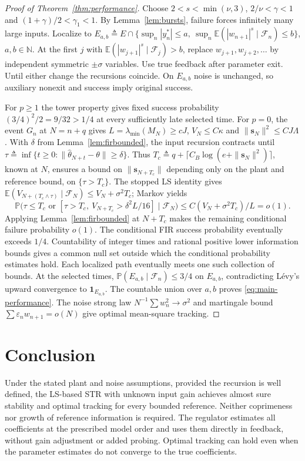 \documentclass[11pt,reqno]{amsart}
\numberwithin{equation}{section}
\theoremstyle{definition}
\theoremstyle{remark}
\newcommand{\E}{\mathbb E}
\newcommand{\Prob}{\mathbb P}
\newcommand{\F}{\mathcal F}
\newcommand{\thh}{\widehat\theta}
\newcommand{\ind}{\mathbf 1}
\begin{document}
\begin{proof}[Proof of Theorem~\ref{thm:performance}]
Choose $2<s<\min(\nu,3)$, $2/\nu<\gamma<1$ and $(1+\gamma)/2<\gamma_1<1$. By Lemma~\ref{lem:bursts}, failure forces infinitely many large inputs. Localize to
$E_{a,b}\triangleq E\cap\{\sup_n|y_n^*|\le a,\ \sup_n\E(|w_{n+1}|^s\mid\F_n)\le b\}$, $a,b\in\mathbb N$. At the first $j$ with $\E(|w_{j+1}|^s\mid\F_j)>b$, replace $w_{j+1},w_{j+2},\ldots$ by independent symmetric $\pm\sigma$ variables. Use true feedback after parameter exit. Until either change the recursions coincide. On $E_{a,b}$ noise is unchanged, so auxiliary nonexit and success imply original success.

For $p\ge1$ the tower property gives fixed success probability $(3/4)^2/2=9/32>1/4$ at every sufficiently late selected time. For $p=0$, the event $G_n$ at $N=n+q$ gives
$L=\lambda_{\min}(M_N)\ge cJ$, $V_N\le C\kappa$ and
$\|\mathbf s_N\|^2\le CJ\Lambda$. With $\delta$ from Lemma~\ref{lem:firbounded}, the input recursion contracts until $\tau\triangleq\inf\{t\ge0:\|\thh_{N+t}-\theta\|\ge\delta\}$.
Thus $T_c\triangleq q+\lceil C_B\log(e+\|\mathbf s_N\|^2)\rceil$, known at $N$, ensures a bound on $\|\mathbf s_{N+T_c}\|$ depending only on the plant and reference bound, on $\{\tau>T_c\}$.
The stopped LS identity gives $\E(V_{N+(T_c\wedge\tau)}\mid\F_N)\le V_N+\sigma^2T_c$; Markov yields
\[
 \Prob\bigl(\tau\le T_c\text{ or }[\tau>T_c,\ V_{N+T_c}>\delta^2L/16]\mid\F_N\bigr)
 \le C(V_N+\sigma^2T_c)/L=o(1).
\]
Applying Lemma~\ref{lem:firbounded} at $N+T_c$ makes the remaining conditional failure probability $o(1)$. The conditional FIR success probability eventually exceeds $1/4$.
Countability of integer times and rational positive lower information bounds gives a common null set outside which the conditional probability estimates hold. Each localized path eventually meets one such collection of bounds. At the selected times, $\Prob(E_{a,b}\mid\F_n)\le3/4$ on $E_{a,b}$, contradicting L\'evy's upward convergence to $\ind_{E_{a,b}}$. The countable union over $a,b$ proves \eqref{eq:main-performance}. The noise strong law $N^{-1}\sum w_n^2\to\sigma^2$ and martingale bound $\sum\varepsilon_n w_{n+1}=o(N)$ give optimal mean-square tracking.
\end{proof}


\section{Conclusion}\label{sec:conclusion}
Under the stated plant and noise assumptions, provided the recursion is well defined, the LS-based STR with unknown input gain achieves almost sure stability and optimal tracking for every bounded reference. Neither coprimeness nor growth of reference information is required. The regulator estimates all coefficients at the prescribed model order and uses them directly in feedback, without gain adjustment or added probing. Optimal tracking can hold even when the parameter estimates do not converge to the true coefficients.
\end{document}
